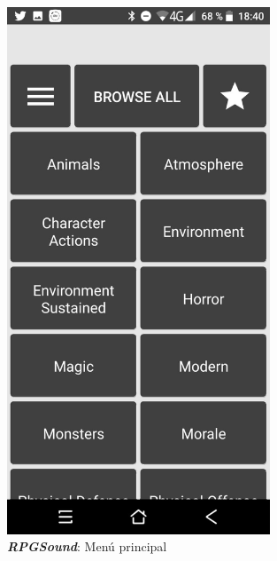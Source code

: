 \begin{figure}[H]
    \centering
    \begin{minipage}{0.3\textwidth}
        \centering
        \includegraphics[width=0.7\textwidth]{Images/RPGSound_1.jpeg}
        \caption{\textit{\textbf{RPGSound}}: Menú principal}
        \label{RPGSound1} 
    \end{minipage} \hspace{2cm}
    \begin{minipage}{0.3\textwidth}
        \centering

\end{minipage}
\end{figure}
